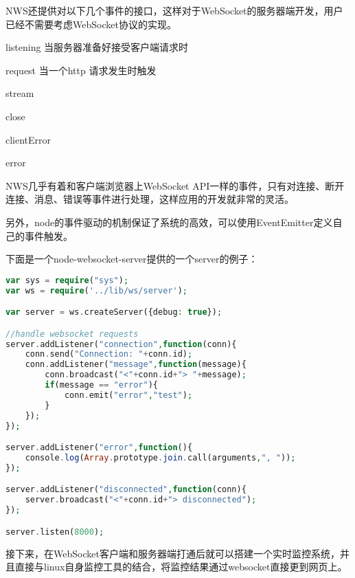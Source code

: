 NWS还提供对以下几个事件的接口，这样对于WebSocket的服务器端开发，用户已经不需要考虑WebSocket协议的实现。


\begin{compactitem}
\item listening 当服务器准备好接受客户端请求时
\item request 当一个http 请求发生时触发
\item stream
\item close
\item clientError
\item error
\end{compactitem}

NWS几乎有着和客户端浏览器上WebSocket API一样的事件，只有对连接、断开连接、消息、错误等事件进行处理，这样应用的开发就非常的灵活。

另外，node的事件驱动的机制保证了系统的高效，可以使用EventEmitter定义自己的事件触发。





下面是一个node-websocket-server提供的一个server的例子：

\begin{lstlisting}[language=PHP]
var sys = require("sys");
var ws = require('../lib/ws/server');

var server = ws.createServer({debug: true});

//handle websocket requests
server.addListener("connection",function(conn){
	conn.send("Connection: "+conn.id);
	conn.addListener("message",function(message){
		conn.broadcast("<"+conn.id+"> "+message);
		if(message == "error"){
			conn.emit("error","test");
		}
	});
});

server.addListener("error",function(){
	console.log(Array.prototype.join.call(arguments,", "));
});

server.addListener("disconnected",function(conn){
	server.broadcast("<"+conn.id+"> disconnected");
});

server.listen(8000);
\end{lstlisting}

接下来，在WebSocket客户端和服务器端打通后就可以搭建一个实时监控系统，并且直接与linux自身监控工具的结合，将监控结果通过websocket直接更到网页上。

